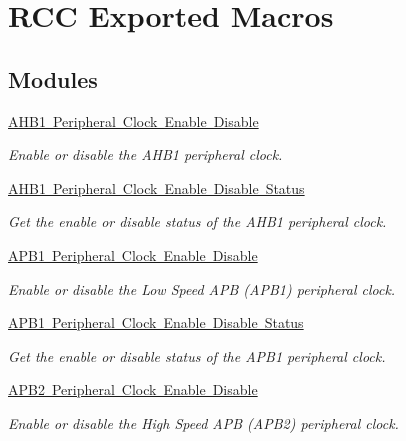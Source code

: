 \hypertarget{group___r_c_c___exported___macros}{}\section{R\+CC Exported Macros}
\label{group___r_c_c___exported___macros}
\subsection*{Modules}
\begin{DoxyCompactItemize}
\item 
\mbox{\hyperlink{group___r_c_c___a_h_b1___clock___enable___disable}{A\+H\+B1 Peripheral Clock Enable Disable}}
\begin{DoxyCompactList}\small\item\em Enable or disable the A\+H\+B1 peripheral clock. \end{DoxyCompactList}\item 
\mbox{\hyperlink{group___r_c_c___a_h_b1___peripheral___clock___enable___disable___status}{A\+H\+B1 Peripheral Clock Enable Disable Status}}
\begin{DoxyCompactList}\small\item\em Get the enable or disable status of the A\+H\+B1 peripheral clock. \end{DoxyCompactList}\item 
\mbox{\hyperlink{group___r_c_c___a_p_b1___clock___enable___disable}{A\+P\+B1 Peripheral Clock Enable Disable}}
\begin{DoxyCompactList}\small\item\em Enable or disable the Low Speed A\+PB (A\+P\+B1) peripheral clock. \end{DoxyCompactList}\item 
\mbox{\hyperlink{group___r_c_c___a_p_b1___peripheral___clock___enable___disable___status}{A\+P\+B1 Peripheral Clock Enable Disable Status}}
\begin{DoxyCompactList}\small\item\em Get the enable or disable status of the A\+P\+B1 peripheral clock. \end{DoxyCompactList}\item 
\mbox{\hyperlink{group___r_c_c___a_p_b2___clock___enable___disable}{A\+P\+B2 Peripheral Clock Enable Disable}}
\begin{DoxyCompactList}\small\item\em Enable or disable the High Speed A\+PB (A\+P\+B2) peripheral clock. \end{DoxyCompactList}\item 

\end{DoxyCompactItemize}

